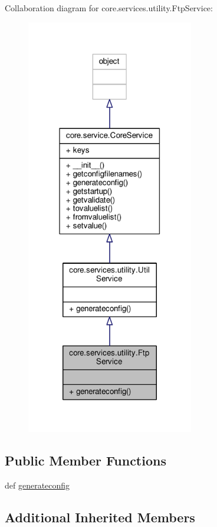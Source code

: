 Collaboration diagram for core.\+services.\+utility.\+Ftp\+Service\+:
\nopagebreak
\begin{figure}[H]
\begin{center}
\leavevmode
\includegraphics[width=207pt]{classcore_1_1services_1_1utility_1_1_ftp_service__coll__graph}
\end{center}
\end{figure}
\subsection*{Public Member Functions}
\begin{DoxyCompactItemize}
\item 
def \hyperlink{classcore_1_1services_1_1utility_1_1_ftp_service_a76a83253e7aa37e78759c7e30ec04248}{generateconfig}
\end{DoxyCompactItemize}
\subsection*{Additional Inherited Members}


